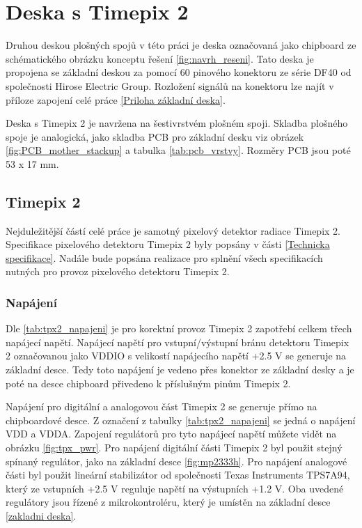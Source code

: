 \section{Deska s Timepix 2}
	\label{Deska s Timepix2}
	Druhou deskou plošných spojů v této práci je deska označovaná jako chipboard ze schématického obrázku konceptu řešení \ref{fig:navrh_reseni}. Tato deska je propojena se základní deskou za pomocí 60 pinového konektoru ze série DF40 od společnosti Hirose Electric Group. Rozložení signálů na konektoru lze najít v příloze zapojení celé práce \ref{Priloha základní deska}.
	
	\par Deska s Timepix 2 je navržena na šestivrstvém plošném spoji. Skladba plošného spoje je analogická, jako skladba PCB pro základní desku viz obrázek \ref{fig:PCB_mother_stackup} a tabulka \ref{tab:pcb_vrstvy}. Rozměry PCB jsou poté 53 x 17 mm. 
\subsection{Timepix 2}	%
	Nejduležitější částí celé práce je samotný pixelový detektor radiace Timepix 2. Specifikace pixelového detektoru Timepix 2 byly popsány v části \ref{Technicka specifikace}. Nadále bude popsána realizace pro splnění všech specifikacích nutných pro provoz pixelového detektoru Timepix 2.
	\subsubsection{Napájení}	%
	Dle \ref{tab:tpx2_napajeni} je pro korektní provoz Timepix 2 zapotřebí celkem třech napájecí napětí. Napájecí napětí pro vstupní/výstupní bránu detektoru Timepix 2 označovanou jako VDDIO s velikostí napájecího napětí +2.5 V se generuje na základní desce. Tedy toto napájení je vedeno přes konektor ze základní desky a je poté na desce chipboard přivedeno k příslušným pinům Timepix 2.
	\par Napájení pro digitální a analogovou část Timepix 2 se generuje přímo na chipboardové desce. Z označení z tabulky \ref{tab:tpx2_napajeni} se jedná o napájení VDD a VDDA. Zapojení regulátorů pro tyto napájecí napětí můžete vidět na obrázku \ref{fig:tpx_pwr}. Pro napájení digitální části Timepix 2 byl použit stejný spínaný regulátor, jako na základní desce \ref{fig:mp2333h}. Pro napájení analogové části byl použit lineární stabilizátor od společnosti Texas Instruments TPS7A94, který ze vstupních +2.5 V reguluje napětí na výstupních +1.2 V. Oba uvedené regulátory jsou řízené z mikrokontroléru, který je umístěn na základní desce \ref{zakladni deska}.
	
